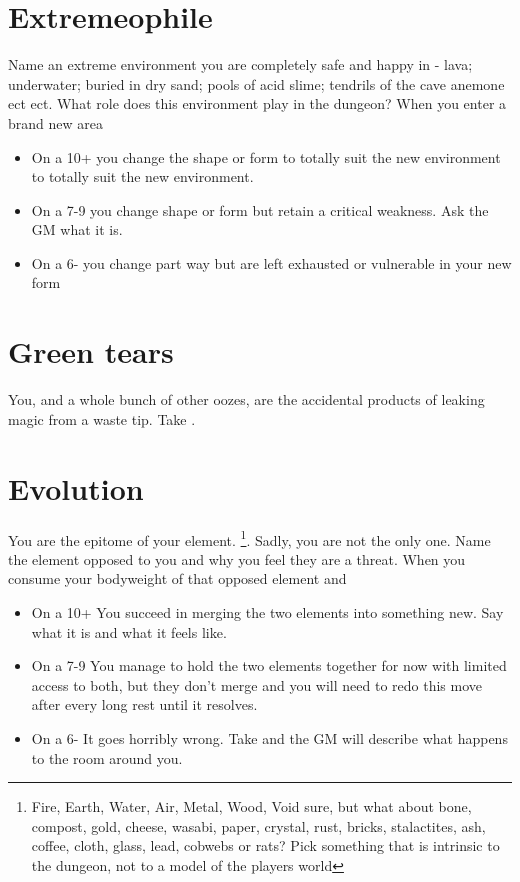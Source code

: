 \documentclass{tufte-book}
\begin{document}
\section{Extremeophile} 
Name an extreme environment you are completely safe and happy in - lava; underwater; buried in dry sand; pools of acid slime; tendrils of the cave anemone ect ect. What role does this environment play in the dungeon?
When you enter a brand new area 
\begin{itemize} 
\item On a 10+ you change the shape or form to totally suit the new environment to totally suit the new environment.
\item On a 7-9 you change shape or form but retain a critical weakness. Ask the GM what it is.
\item On a 6- you change part way but are left exhausted or vulnerable in your new form
\end{itemize}

\section{ Green tears} 
You, and a whole bunch of other oozes, are the accidental products of leaking magic from a waste tip. Take .

\section{Evolution} 
You are the epitome of your element. \footnote{Fire, Earth, Water, Air, Metal, Wood, Void sure, but what about bone, compost, gold, cheese, wasabi, paper, crystal, rust, bricks, stalactites, ash, coffee, cloth, glass, lead, cobwebs or rats? Pick something that is intrinsic to the dungeon, not to a model of the players world }. Sadly, you are not the only one. Name the element opposed to you and why you feel they are a threat.
When you consume your bodyweight of that opposed element  and 
\begin{itemize}
\item On a 10+ You succeed in merging the two elements into something new. Say what it is and what it feels like.
\item On a 7-9 You manage to hold the two elements together for now with limited access to both, but they don't merge and you will need to redo this move after every long rest until it resolves.
\item On a 6- It goes horribly wrong. Take  and the GM will describe what happens to the room around you.
 \end{itemize}
\end{document}
